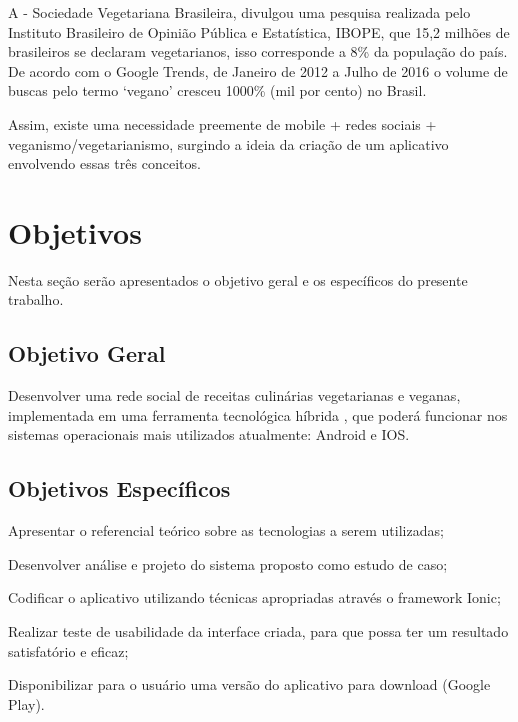 A \citeauthor{svb} - Sociedade Vegetariana Brasileira, divulgou uma pesquisa realizada pelo Instituto Brasileiro de Opinião Pública e Estatística, IBOPE, que 15,2 milhões de brasileiros se declaram vegetarianos, isso corresponde a 8\% da população do país. De acordo com o Google Trends, de Janeiro de 2012 a Julho de 2016 o volume de buscas pelo termo ‘vegano’ cresceu 1000\% (mil por cento) no Brasil.

Assim, existe uma necessidade preemente de mobile + redes sociais + veganismo/vegetarianismo, surgindo a ideia da criação de um aplicativo envolvendo essas três conceitos.
 
\section{Objetivos}

Nesta seção serão apresentados o objetivo geral e os específicos do presente trabalho.

\subsection{Objetivo Geral}

Desenvolver uma rede social de receitas culinárias vegetarianas e veganas, implementada em uma ferramenta tecnológica híbrida , que poderá funcionar nos sistemas operacionais mais utilizados atualmente: Android e IOS.

\subsection{Objetivos Específicos}
\begin{lista}
  \item Apresentar o referencial teórico sobre as tecnologias a serem utilizadas;
  \item Desenvolver análise e projeto do sistema proposto como estudo de caso;
  \item Codificar o aplicativo utilizando técnicas apropriadas através o framework Ionic;
  \item Realizar teste de usabilidade da interface criada, para que possa ter um resultado satisfatório e eficaz;
  \item Disponibilizar para o usuário uma versão do aplicativo para download (Google Play).
\end{lista}